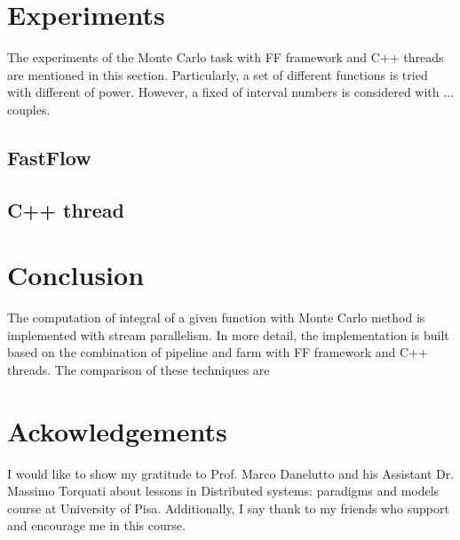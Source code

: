 \documentclass[runningheads,a4paper]{llncs}
\begin{document}
\section{Experiments}
\label{sec:exper}
The experiments of the Monte Carlo task with FF framework and C++ threads are mentioned in this section.
Particularly, a set of different functions is tried with different of power. However, a fixed of interval numbers is considered with ... couples.

\subsection{FastFlow}

\subsection{C++ thread}


\section{Conclusion}
\label{Conc}
The computation of integral of a given function with Monte Carlo method is implemented with stream parallelism.
In more detail, the implementation is built based on the combination of pipeline and farm with FF framework and C++ threads.
The comparison of these techniques are

\section{Ackowledgements}
I would like to show my gratitude to Prof. Marco Danelutto and his Assistant Dr. Massimo Torquati about lessons in Distributed systems: paradigms and models course at University of Pisa.
Additionally, I say thank to my friends who support and encourage me in this course.



\end{document}
